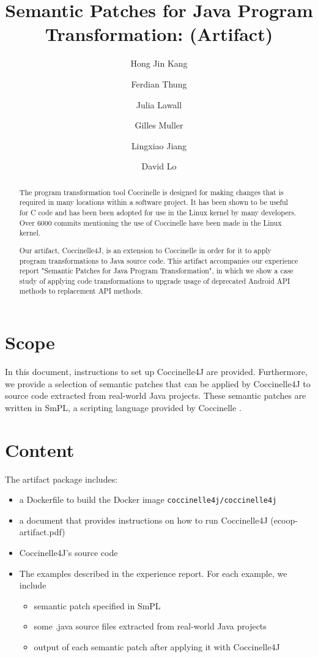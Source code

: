 \documentclass[a4paper,UKenglish]{darts-v2019}
\title{Semantic Patches for Java Program Transformation: (Artifact)}
\author{Hong Jin Kang}{School of Information Systems, Singapore Management University, Singapore}{hjkang.2018@phdis.smu.edu.sg}{}{}
\author{Ferdian Thung}{School of Information Systems, Singapore Management University, Singapore}{ferdiant.2013@phdis.smu.edu.sg}{}{}
\author{Julia Lawall}{Sorbonne Université/Inria/LIP6, France}{Julia.Lawall@lip6.fr,}{}{}
\author{Gilles Muller}{Sorbonne Université/Inria/LIP6, France}{Gilles.Muller@lip6.fr}{}{}
\author{Lingxiao Jiang}{School of Information Systems, Singapore Management University, Singapore}{lxjiang@smu.edu.sg}{}{}
\author{David Lo}{School of Information Systems, Singapore Management University, Singapore}{davidlo@smu.edu.sg}{}{}
\newenvironment{scope}{\section{Scope}}{}
\newenvironment{content}{\section{Content}}{}
\begin{document}
\maketitle

\begin{abstract}
The program transformation tool Coccinelle is designed for making changes that is required in many locations within a software project.
It has been shown to be useful for C code and has been been adopted for use in the Linux kernel by many developers. 
Over 6000 commits mentioning the use of Coccinelle have been made in the Linux kernel. 

Our artifact, Coccinelle4J, is an extension to Coccinelle in order for it to apply program transformations to Java source code. 
This artifact accompanies our experience report "Semantic Patches for Java Program Transformation", in which we show a case study of applying code transformations to upgrade usage of deprecated Android API methods to  replacement API methods. 
 \end{abstract}


\begin{scope}


In this document, instructions to set up Coccinelle4J are provided. 
Furthermore, we provide a selection of semantic patches that can be applied by Coccinelle4J to source code extracted from real-world Java projects. 
These semantic patches are written in SmPL, a scripting language provided by Coccinelle \cite{padioleau2007smpl}. 

\end{scope}

\begin{content}
The artifact package includes:
\begin{itemize}
\item a Dockerfile to build the Docker image \texttt{coccinelle4j/coccinelle4j}
\item a document that provides instructions on how to run Coccinelle4J (ecoop-artifact.pdf)
\item Coccinelle4J's source code
\item The examples described in the experience report. For each example, we include
\begin{itemize} 
    \item semantic patch specified in SmPL
    \item some .java source files extracted from real-world Java projects
    \item output of each semantic patch after applying it with Coccinelle4J
\end{itemize} 

\end{itemize}
\end{content}
\end{document}
